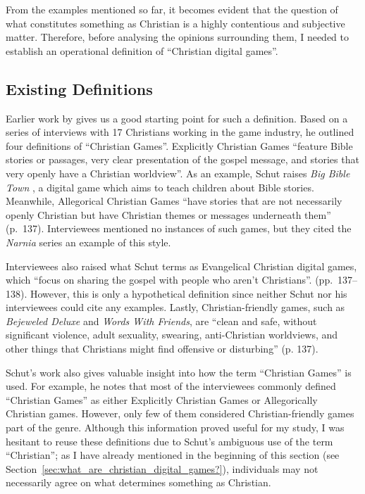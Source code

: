 From the examples mentioned so far, it becomes evident that the question of what constitutes something as Christian is a highly contentious and subjective matter. Therefore, before analysing the opinions surrounding them, I needed to establish an operational definition of ``Christian digital games''.

\subsection{Existing Definitions} \label{sec:existing_definitions}

Earlier work by \textcite{schut_making_2013} gives us a good starting point for such a definition. Based on a series of interviews with 17 Christians working in the game industry, he outlined four definitions of ``Christian Games''. Explicitly Christian Games ``feature Bible stories or passages, very clear presentation of the gospel message, and stories that very openly have a Christian worldview''. As an example, Schut raises \textit{Big Bible Town} \parencite{third_day_games_big_2010}, a digital game which aims to teach children about Bible stories. Meanwhile, Allegorical Christian Games ``have stories that are not necessarily openly Christian but have Christian themes or messages underneath them'' (p.~137). Interviewees mentioned no instances of such games, but they cited the \textit{Narnia} series \parencite{lewis_the_1950_1956} an example of this style.

Interviewees also raised what Schut terms as Evangelical Christian digital games, which ``focus on sharing the gospel with people who aren't Christians''. (pp.~137--138). However, this is only a hypothetical definition since neither Schut nor his interviewees could cite any examples. Lastly, Christian-friendly games, such as \textit{Bejeweled Deluxe} \parencite{kapalka_bejeweled_2001} \parencite{newtoy_words_2009} and \textit{Words With Friends}, are ``clean and safe, without significant violence, adult sexuality, swearing, anti-Christian worldviews, and other things that Christians might find offensive or disturbing'' (p. 137).

Schut's work also gives valuable insight into how the term ``Christian Games'' is used. For example, he notes that most of the interviewees commonly defined ``Christian Games'' as either Explicitly Christian Games or Allegorically Christian games. However, only few of them considered Christian-friendly games part of the genre. Although this information proved useful for my study, I was hesitant to reuse these definitions due to Schut's ambiguous use of the term ``Christian''; as I have already mentioned in the beginning of this section (see Section~\ref{sec:what_are_christian_digital_games?}), individuals may not necessarily agree on what determines something as Christian.

